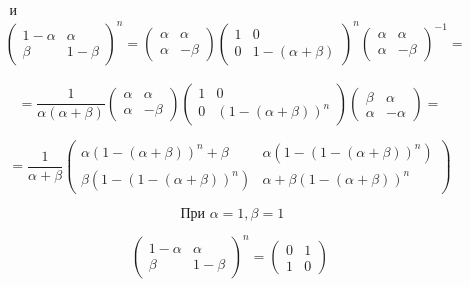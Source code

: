 \documentclass[a4paper,12pt]{article} %
\begin{document}
\begin{example}
\[ \begin{aligned}
&\text { и }\\
&\left(\begin{array}{cc}
	1-\alpha & \alpha \\
	\beta & 1-\beta
\end{array}\right)^{n}=\left(\begin{array}{cc}
	\alpha & \alpha \\
	\alpha & -\beta
\end{array}\right)\left(\begin{array}{cc}
	1 & 0 \\
	0 & 1-(\alpha+\beta)
\end{array}\right)^{n}\left(\begin{array}{cc}
	\alpha & \alpha \\
	\alpha & -\beta
\end{array}\right)^{-1}=
\end{aligned} \]




$$
=\frac{1}{\alpha(\alpha+\beta)}\left(\begin{array}{cc}
\alpha & \alpha \\
\alpha & -\beta
\end{array}\right)\left(\begin{array}{cc}
1 & 0 \\
0 & (1-(\alpha+\beta))^{n}
\end{array}\right)\left(\begin{array}{cc}
\beta & \alpha \\
\alpha & -\alpha
\end{array}\right)=
$$


$$
=\frac{1}{\alpha+\beta}\left(\begin{array}{cc}
\alpha(1-(\alpha+\beta))^{n}+\beta & \alpha\left(1-(1-(\alpha+\beta))^{n}\right) \\
\beta\left(1-(1-(\alpha+\beta))^{n}\right) & \alpha+\beta(1-(\alpha+\beta))^{n}
\end{array}\right)
$$




$$
\text { При } \alpha = 1, \beta = 1
$$



$$
\left(\begin{array}{cc}
1-\alpha & \alpha \\
\beta & 1-\beta
\end{array}\right)^{n}=
\left(\begin{array}{cc}
0 & 1 \\
1 & 0
\end{array}\right)
$$





\end{example}
\end{document}

